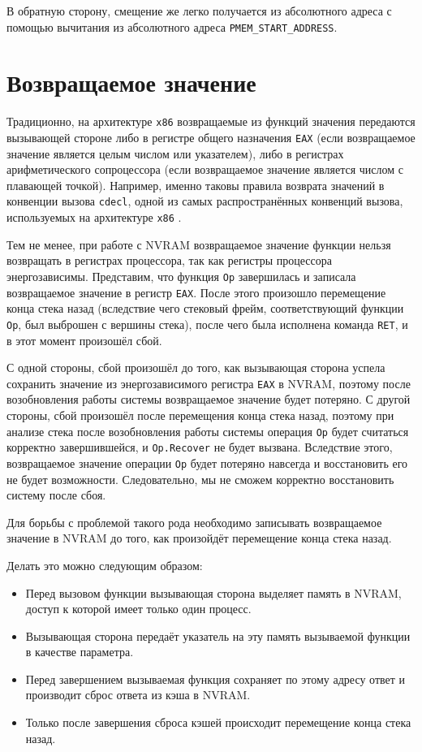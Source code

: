 \documentclass[times,specification,annotation]{itmo-student-thesis}
\begin{document}
В обратную сторону, смещение же легко получается из абсолютного адреса с помощью вычитания из абсолютного адреса \texttt{PMEM\_START\_ADDRESS}.

\section{Возвращаемое значение}
\label{return-value}

Традиционно, на архитектуре \texttt{x86} возвращаемые из функций значения передаются вызывающей стороне либо в регистре общего назначения \texttt{EAX} (если возвращаемое значение является целым числом или указателем), либо в регистрах арифметического сопроцессора (если возвращаемое значение является числом с плавающей точкой). Например, именно таковы правила возврата значений в конвенции вызова \texttt{cdecl}, одной из самых распространённых конвенций вызова, используемых на архитектуре \texttt{x86} \cite{calling-conventions}.

Тем не менее, при работе с NVRAM возвращаемое значение функции нельзя возвращать в регистрах процессора, так как регистры процессора энергозависимы. Представим, что функция \texttt{Op} завершилась и записала возвращаемое значение в регистр \texttt{EAX}. После этого произошло перемещение конца стека назад (вследствие чего стековый фрейм, соответствующий функции \texttt{Op}, был выброшен с вершины стека), после чего была исполнена команда \texttt{RET}, и в этот момент произошёл сбой.

С одной стороны, сбой произошёл до того, как вызывающая сторона успела сохранить значение из энергозависимого регистра \texttt{EAX} в NVRAM, поэтому после возобновления работы системы возвращаемое значение будет потеряно. С другой стороны, сбой произошёл после перемещения конца стека назад, поэтому при анализе стека после возобновления работы системы операция \texttt{Op} будет считаться корректно завершившейся, и \texttt{Op.Recover} не будет вызвана. Вследствие этого, возвращаемое значение операции \texttt{Op} будет потеряно навсегда и восстановить его не будет возможности. Следовательно, мы не сможем корректно восстановить систему после сбоя.

Для борьбы с проблемой такого рода необходимо записывать возвращаемое значение в NVRAM до того, как произойдёт перемещение конца стека назад.

Делать это можно следующим образом:

\begin{itemize}
    \item Перед вызовом функции вызывающая сторона выделяет память в NVRAM, доступ к которой имеет только один процесс.
    
    \item Вызывающая сторона передаёт указатель на эту память вызываемой функции в качестве параметра.
    
    \item Перед завершением вызываемая функция сохраняет по этому адресу ответ и производит сброс ответа из кэша в NVRAM.
    
    \item Только после завершения сброса кэшей происходит перемещение конца стека назад.
\end{itemize}
\end{document}
